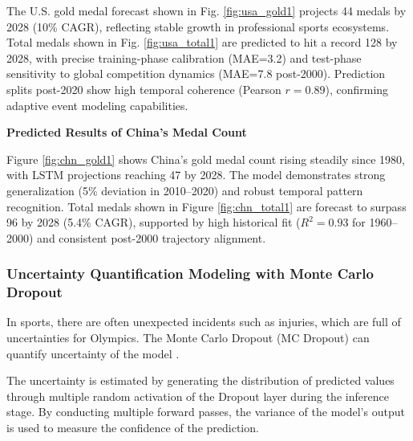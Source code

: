 \documentclass{mcmthesis}
\begin{document}
The U.S. gold medal forecast shown in Fig. \ref{fig:usa_gold1} projects 44 medals by 2028 (10\% CAGR), reflecting stable growth in professional sports ecosystems. Total medals shown in Fig. \ref{fig:usa_total1} are predicted to hit a record 128 by 2028, with precise training-phase calibration (MAE=3.2) and test-phase sensitivity to global competition dynamics (MAE=7.8 post-2000). Prediction splits post-2020 show high temporal coherence (Pearson $r=0.89$), confirming adaptive event modeling capabilities.


\textbf{Predicted Results of China’s Medal Count}

Figure \ref{fig:chn_gold1} shows China's gold medal count rising steadily since 1980, with LSTM projections reaching 47 by 2028. The model demonstrates strong generalization (5\% deviation in 2010–2020) and robust temporal pattern recognition. Total medals shown in Figure \ref{fig:chn_total1} are forecast to surpass 96 by 2028 (5.4\% CAGR), supported by high historical fit ($R^2=0.93$ for 1960–2000) and consistent post-2000 trajectory alignment.


\subsubsection{Uncertainty Quantification Modeling with Monte Carlo Dropout}

In sports, there are often unexpected incidents such as injuries, which are full of uncertainties for Olympics. The Monte Carlo Dropout (MC Dropout) can quantify uncertainty of the model \cite{gal2016dropout}.

The uncertainty is estimated by generating the distribution of predicted values through multiple random activation of the Dropout layer during the inference stage. By conducting multiple forward passes, the variance of the model's output is used to measure the confidence of the prediction.
\end{document}
